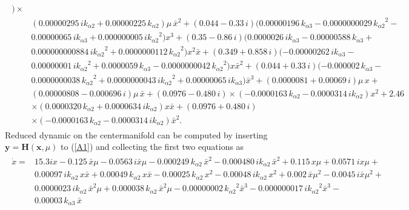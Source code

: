 \documentclass[openacc]{rsproca_new}%
\def\vec#1{\ensuremath{\mathbf{#1}}}
\newcommand{\Eref}[1]{(\ref{#1})}
\begin{document}
\begin{appendices}
\begin{align}
\begin{split}
  ) \times \\&(  0.00000295\,i{  k_{\alpha 2}}+ 0.00000225\,{  k_{\alpha 2}}
  ) \mu\,{\bar x}^{2}+ (  0.044- 0.33\,i )  (
  0.00000196\,{  k_{\alpha 3}}- 0.0000000029\,{{  k_{\alpha 2}}}^{2}- \\&0.00000065\,i
  {  k_{\alpha 3}}+ 0.000000005\,i{{  k_{\alpha 2}}}^{2} ) {x}^{3}+ (
  0.35- 0.86\,i )  (  0.0000026\,i{  k_{\alpha 3}}- 0.00000588\,
  {  k_{\alpha 3}}+ \\&0.000000000884\,i{{  k_{\alpha 2}}}^{2}+ 0.0000000112\,{{  k_{\alpha 2}}}
  ^{2} ) {x}^{2}\bar x+ (  0.349+ 0.858\,i )  ( -
  0.00000262\,i{  k_{\alpha 3}}- \\&0.00000001\,i{{  k_{\alpha 2}}}^{2}+ 0.0000059\,{
    k_{\alpha 3}}- 0.0000000042\,{{  k_{\alpha 2}}}^{2} ) x{\bar x}^{2}+ (
  0.044+ 0.33\,i )  ( - 0.000002\,{  k_{\alpha 3}}-\\&
  0.0000000038\,{{  k_{\alpha 2}}}^{2}+ 0.0000000043\,i{{  k_{\alpha 2}}}^{2}+
  0.00000065\,i{  k_{\alpha 3}} ) {\bar x}^{3}+ (  0.0000081+ 0.00069
  \,i ) \mu\,x+ \\&(  0.00000808- 0.000696\,i ) \mu\,\bar x+
  (  0.0976- 0.480\,i ) \times   ( - 0.0000163\,{  k_{\alpha 2}}-
  0.0000314\,i{  k_{\alpha 2}} ) {x}^{2}+ 2.46\\&
  \times (  0.0000320\,{  k_{\alpha 2}}+ 0.0000634\,i{  k_{\alpha 2}} ) x\bar x+(  0.0976+ 0.480\,i )\\& \times  ( - 0.0000163\,{  k_{\alpha 2}}-
  0.0000314\,i{  k_{\alpha 2}} ) {\bar x}^{2}.
  \end{split}
  \end{align}
\noindent Reduced dynamic on the centermanifold can be computed by inserting $\vec{y}=\vec{H}(\vec x,\mu)$ to \Eref{A1} and collecting the first two equations as
\begin{align}\label{rd1}
\begin{split}
\dot x=&15.3 i  x- 0.125\,\bar x\mu- 0.0563\,i\bar x\mu- 0.000249
\,{   k_{\alpha 2}}\,{\bar x}^{2}- 0.000480\,i{   k_{\alpha 2}}\,{\bar x}^{2}+ 0.115\,x\mu+
0.0571\,ix\mu+ \\&0.00097\,i{   k_{\alpha 2}}\,x\bar x+ 0.00049\,{   k_{\alpha 2}}\,x\bar x-
0.00025\,{   k_{\alpha 2}}\,{x}^{2}- 0.00048\,i{   k_{\alpha 2}}\,{x}^{2}+ 0.002
\,\bar x{\mu}^{2}- 0.0045\,i\bar x{\mu}^{2}+ \\&0.0000023\,i{   k_{\alpha 2}}\,{\bar x}^{2}\mu
+ 0.000038\,{   k_{\alpha 2}}\,{\bar x}^{2}\mu- 0.00000002\,{{   k_{\alpha 2}}}^{2}{\bar x}^{
3}- 0.000000017\,i{{   k_{\alpha 2}}}^{2}{\bar x}^{3}- \\&0.00003\,{   k_{\alpha 3}}\,{\bar x}^{
}
\end{split}
\end{align}
\end{appendices}
\end{document}
